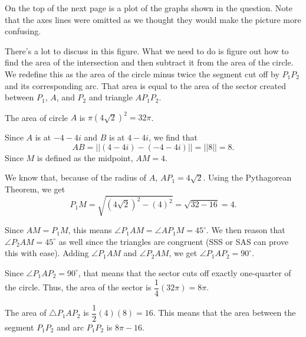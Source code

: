 \documentclass[lang=en,11pt]{elegantbook}
\begin{document}
On the top of the next page is a plot of the graphs shown in the question.  Note that the axes lines were omitted as we thought they would make the picture more confusing.

\begin{figure}[!ht]
    \centering
\end{figure}

There's a lot to discuss in this figure.  What we need to do is figure out how to find the area of the intersection and then subtract it from the area of the circle.  We redefine this as the area of the circle minus twice the segment cut off by $P_1P_2$ and its corresponding arc.  That area is equal to the area of the sector created between $P_1$, $A$, and $P_2$ and triangle $AP_1P_2$.

The area of circle $A$ is $\pi\left(4\sqrt{2}\right)^2=32\pi$.

Since $A$ is at $-4-4i$ and $B$ is at $4-4i$, we find that $$AB=||(4-4i)-(-4-4i)||=||8||=8.$$  Since $M$ is defined as the midpoint, $AM=4$.

We know that, because of the radius of $A$, $AP_1=4\sqrt{2}$.  Using the Pythagorean Theorem, we get $$P_1M=\sqrt{(4\sqrt{2})^2-(4)^2}=\sqrt{32-16}=4.$$

Since $AM=P_1M$, this means $\angle P_1AM=\angle AP_1M=45^{\circ}.$  We then reason that $\angle P_2AM=45^{\circ}$ as well since the triangles are congruent (SSS or SAS can prove this with ease).  Adding $\angle P_1AM$ and $\angle P_2AM$, we get $\angle P_1AP_2=90^{\circ}$.

Since $\angle P_1AP_2=90^{\circ}$, that means that the sector cuts off exactly one-quarter of the circle.  Thus, the area of the sector is $\dfrac{1}{4}(32\pi)=8\pi.$

The area of $\triangle P_1AP_2$ is $\dfrac{1}{2}(4)(8)=16$.  This means that the area between the segment $P_1P_2$ and arc $P_1P_2$ is $8\pi-16$.
\end{document}

